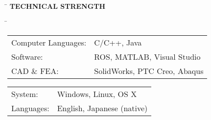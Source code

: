 \documentclass[11pt,letter]{article}
\begin{document}


%

	\begin{tabbing}
		\hspace{2cm}\=\kill
		\>  {\bf \Large TECHNICAL STRENGTH}
	\end{tabbing}
\begin{tabbing}
	\hspace{0cm} \= \kill
	\> \begin{minipage}{0.56\columnwidth}
		\begin{tabular}{ll}
			Computer Languages:& C/C++, Java\\
			Software:& ROS, MATLAB, Visual Studio \\
			CAD \& FEA:& SolidWorks, PTC Creo, Abaqus\\
		\end{tabular}
	\end{minipage}
	\begin{minipage}{0.34\columnwidth}
		\begin{tabular}{ll}
			System: & Windows, Linux, OS X\\
			Languages: & English, Japanese (native)\\
		\end{tabular}
	\end{minipage}
\end{tabbing}
\end{document}
